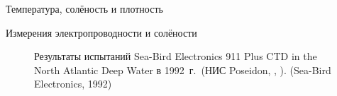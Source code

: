 \begin{chapter}{Температура, солёность и плотность}
\begin{section}{Измерения электропроводности и солёности}
\begin{figure}[b!]
\caption{Результаты испытаний Sea-Bird Electronics 911 Plus CTD 
in the North Atlantic Deep Water в 1992~г.\ 
(НИС Poseidon, , ). 
(Sea-Bird Electronics, 1992)}
\label{fig:911data}
\end{figure}
% 


\end{section}
\end{chapter}
